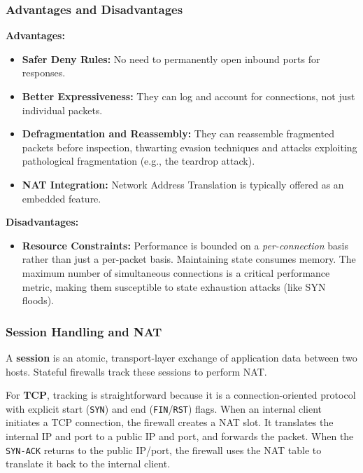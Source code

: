 \subsubsection{Advantages and Disadvantages}

\textbf{Advantages:}
\begin{itemize}
    \item \textbf{Safer Deny Rules:} No need to permanently open inbound ports for responses.
    \item \textbf{Better Expressiveness:} They can log and account for connections, not just individual packets.
    \item \textbf{Defragmentation and Reassembly:} They can reassemble fragmented packets before inspection, thwarting evasion techniques and attacks exploiting pathological fragmentation (e.g., the teardrop attack).
    \item \textbf{NAT Integration:} Network Address Translation is typically offered as an embedded feature.
\end{itemize}

\textbf{Disadvantages:}
\begin{itemize}
    \item \textbf{Resource Constraints:} Performance is bounded on a \textit{per-connection} basis rather than just a per-packet basis. Maintaining state consumes memory. The maximum number of simultaneous connections is a critical performance metric, making them susceptible to state exhaustion attacks (like SYN floods).
\end{itemize}

\subsubsection{Session Handling and NAT}

A \textbf{session} is an atomic, transport-layer exchange of application data between two hosts. Stateful firewalls track these sessions to perform NAT.

For \textbf{TCP}, tracking is straightforward because it is a connection-oriented protocol with explicit start (\texttt{SYN}) and end (\texttt{FIN}/\texttt{RST}) flags. When an internal client initiates a TCP connection, the firewall creates a NAT slot. It translates the internal IP and port to a public IP and port, and forwards the packet. When the \texttt{SYN-ACK} returns to the public IP/port, the firewall uses the NAT table to translate it back to the internal client.

